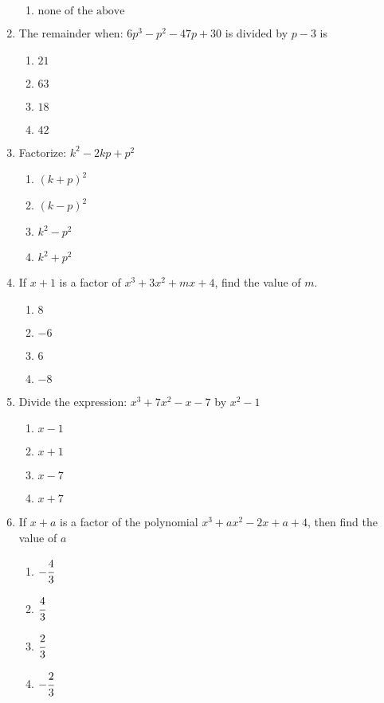 \begin{multicols}{2}
\begin{enumerate}[label={\arabic*.}]
\begin{enumerate}[label={\Alph*.}]
        \item \(\text{none of the above}\)
      \end{enumerate}
    \item The remainder when: \(6p^3 - p^2 -47p + 30\) is divided by \(p-3\) is
      \begin{enumerate}[label={\Alph*.}]
        \item \(21\)
        \item \(63\)
        \item \(18\)
        \item \(42\)
      \end{enumerate}
    \item Factorize: \(k^2 - 2kp + p^2\)
      \begin{enumerate}[label={\Alph*.}]
        \item \({(k+p)}^2\)
        \item \({(k-p)}^2\)
        \item \(k^2 - p^2\)
        \item \(k^2 + p^2\)
      \end{enumerate}
    \item If $x+1$ is a factor of $x^3 + 3x^2 + mx + 4$, find the value of $m$.
      \begin{enumerate}[label={\Alph*.}]
        \item \(8\)
        \item \(-6\)
        \item \(6\)
        \item \(-8\)
      \end{enumerate}
    \item Divide the expression: $x^3 + 7x^2 -x - 7$ by $x^2-1$
      \begin{enumerate}[label={\Alph*.}]
        \item \(x-1\)
        \item \(x+1\)
        \item \(x-7\)
        \item \(x+7\)
      \end{enumerate}
    \item If $x+a$ is a factor of the polynomial $x^3 +ax^2 -2x +a + 4$, then find the value of $a$
      \begin{enumerate}[label={\Alph*.}]
        \item \(-\cfrac{4}{3}\)
        \item \(\cfrac{4}{3}\)
        \item \(\cfrac{2}{3}\)
        \item \(-\cfrac{2}{3}\)

\end{enumerate}
\end{enumerate}
\end{multicols}

